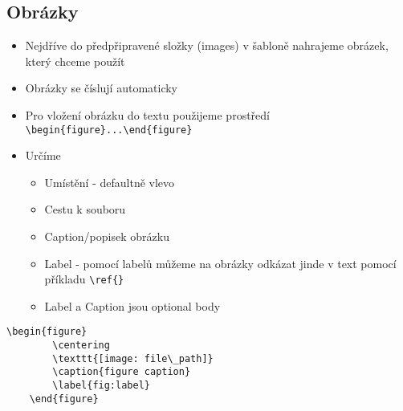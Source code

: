 \subsection{Obrázky}
\begin{itemize}
    \item Nejdříve do předpřipravené složky (images) v šabloně nahrajeme obrázek, který chceme použít
    \item Obrázky se číslují automaticky
    \item Pro vložení obrázku do textu použijeme prostředí \verb|\begin{figure}...\end{figure}|
    
    \item Určíme\begin{itemize}
        \item Umístění - defaultně vlevo
        \item Cestu k souboru
        \item Caption/popisek obrázku
        \item Label - pomocí labelů můžeme na obrázky odkázat jinde v text pomocí příkladu \verb|\ref{}|
        \item Label a Caption jsou optional body
    \end{itemize}
\end{itemize}
\begin{lstlisting}[frame = single]
    \begin{figure}
        \centering 
        \texttt{[image: file\_path]} 
        \caption{figure caption}
        \label{fig:label}
    \end{figure}
\end{lstlisting}


